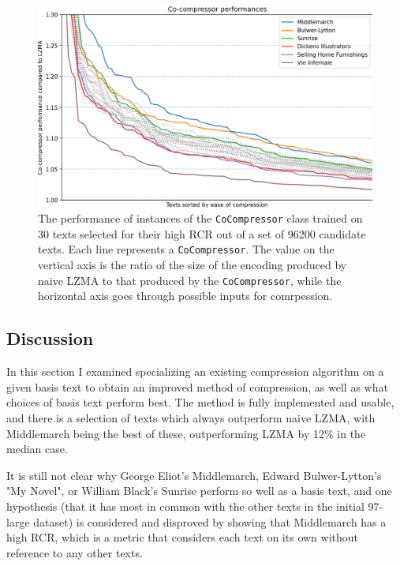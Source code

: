 \begin{figure}[h]
\centering
\includegraphics[width=\textwidth]{img/fig_cocomp_performance_best.png}
\caption{The performance of instances of the \texttt{CoCompressor} class trained on 30 texts selected for their high RCR out of a set of 96200 candidate texts. Each line represents a \texttt{CoCompressor}. The value on the vertical axis is the ratio of the size of the encoding produced by naive LZMA to that produced by the \texttt{CoCompressor}, while the horizontal axis goes through possible inputs for comrpession.}
\label{fig:cocomp_comparison_best}
\end{figure}



\subsection{Discussion}

In this section I examined specializing an existing compression algorithm on a given basis text to obtain an improved method of compression, as well as what choices of basis text perform best. The method is fully implemented and usable, and there is a selection of texts which always outperform naive LZMA, with Middlemarch being the best of these, outperforming LZMA by 12\% in the median case.

It is still not clear why George Eliot's Middlemarch, Edward Bulwer-Lytton's "My Novel", or William Black's Sunrise perform so well as a basis text, and one hypothesis (that it has most in common with the other texts in the initial 97-large dataset) is considered and disproved by showing that Middlemarch has a high RCR, which is a metric that considers each text on its own without reference to any other texts.

